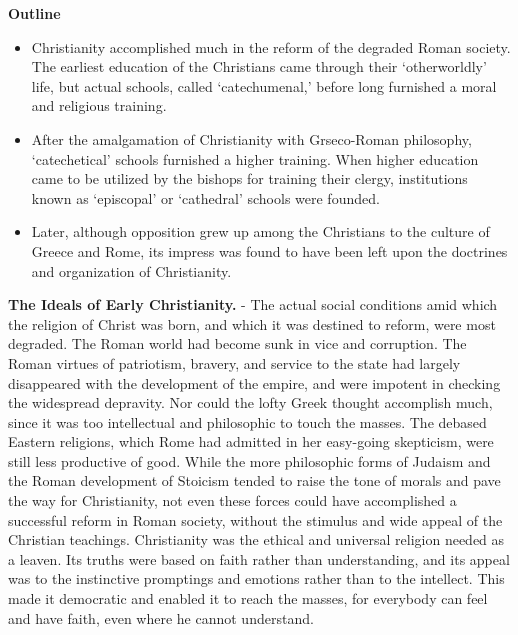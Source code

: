 \documentclass[]{book}
\providecommand{\tightlist}{%
  \setlength{\itemsep}{0pt}\setlength{\parskip}{0pt}}
\begin{document}
\textbf{Outline}

\begin{itemize}
\tightlist
\item
  Christianity accomplished much in the reform of the degraded Roman society. The earliest education of the Christians came through their `otherworldly' life, but actual schools, called `catechumenal,' before long furnished a moral and religious training.
\item
  After the amalgamation of Christianity with Grseco-Roman philosophy, `catechetical' schools furnished a higher training. When higher education came to be utilized by the bishops for training their clergy, institutions known as `episcopal' or `cathedral' schools were founded.
\item
  Later, although opposition grew up among the Christians to the culture of Greece and Rome, its impress was found to have been left upon the doctrines and organization of Christianity.
\end{itemize}

\textbf{The Ideals of Early Christianity.} - The actual social conditions amid which the religion of Christ was born, and which it was destined to reform, were most degraded. The Roman world had become sunk in vice and corruption. The Roman virtues of patriotism, bravery, and service to the state had largely disappeared with the development of the empire, and were impotent in checking the widespread depravity. Nor could the lofty Greek thought accomplish much, since it was too intellectual and philosophic to touch the masses. The debased Eastern religions, which Rome had admitted in her easy-going skepticism, were still less productive of good. While the more philosophic forms of Judaism and the Roman development of Stoicism tended to raise the tone of morals and pave the way for Christianity, not even these forces could have accomplished a successful reform in Roman society, without the stimulus and wide appeal of the Christian teachings. Christianity was the ethical and universal religion needed as a leaven. Its truths were based on faith rather than understanding, and its appeal was to the instinctive promptings and emotions rather than to the intellect. This made it democratic and enabled it to reach the masses, for everybody can feel and have faith, even where he cannot understand.
\end{document}
